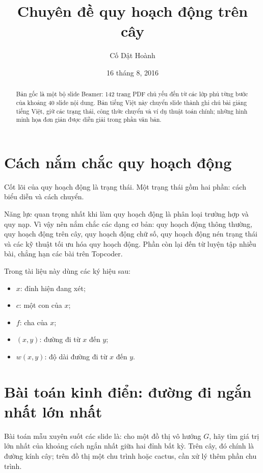 \documentclass[11pt]{article}
\title{Chuyên đề quy hoạch động trên cây}
\author{Cố Dật Hoành}
\date{16 tháng 8, 2016}
\begin{document}
\maketitle
{}

\begin{abstract}
Bản gốc là một bộ slide Beamer: 142 trang PDF chủ yếu đến từ các lớp phủ
từng bước của khoảng 40 slide nội dung. Bản tiếng Việt này chuyển slide thành
ghi chú bài giảng tiếng Việt, giữ các trạng thái, công thức chuyển và ví dụ
thuật toán chính; những hình minh họa đơn giản được diễn giải trong phần văn
bản.
\end{abstract}

\tableofcontents

\section{Cách nắm chắc quy hoạch động}

Cốt lõi của quy hoạch động là trạng thái. Một trạng thái gồm hai phần:
cách biểu diễn và cách chuyển.

Năng lực quan trọng nhất khi làm quy hoạch động là phân loại trường hợp và
quy nạp. Vì vậy nên nắm chắc các dạng cơ bản: quy hoạch động thông thường,
quy hoạch động trên cây, quy hoạch động chữ số, quy hoạch động nén trạng thái
và các kỹ thuật tối ưu hóa quy hoạch động. Phần còn lại đến từ luyện tập nhiều
bài, chẳng hạn các bài trên Topcoder.

Trong tài liệu này dùng các ký hiệu sau:
\begin{itemize}
  \item \(x\): đỉnh hiện đang xét;
  \item \(c\): một con của \(x\);
  \item \(f\): cha của \(x\);
  \item \((x,y)\): đường đi từ \(x\) đến \(y\);
  \item \(w(x,y)\): độ dài đường đi từ \(x\) đến \(y\).
\end{itemize}

\section{Bài toán kinh điển: đường đi ngắn nhất lớn nhất}

Bài toán mẫu xuyên suốt các slide là: cho một đồ thị vô hướng \(G\), hãy tìm
giá trị lớn nhất của khoảng cách ngắn nhất giữa hai đỉnh bất kỳ. Trên cây,
đó chính là đường kính cây; trên đồ thị một chu trình hoặc cactus, cần xử lý
thêm phần chu trình.
\end{document}
